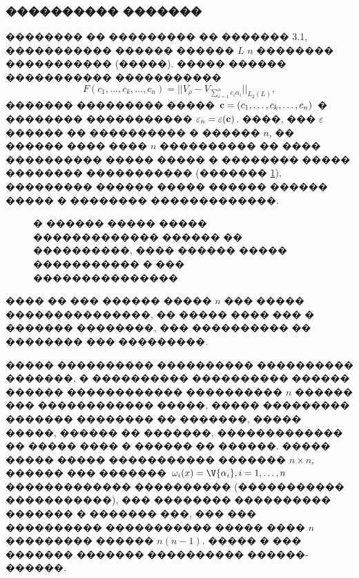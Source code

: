 \documentclass[a4paper]{article}
\begin{document}
\subsubsection{���������� �������}
�������� �� ��������� �� ������� 3.1, ����������� ������ ������ $L$ $n$ �������� ����������� (�����).
����� ������ ����������� �����������
\begin{equation*}
  F(c_1,\dots,c_k,\dots,c_n)=||V_{\rho}-V_{\sum_{i=1}^n c_i \alpha_i}||_{L_2(L)},
\end{equation*}
������� ��������� ����� ${\bf c}=(c_1,\dots,c_k,\dots,c_n)$ � �������� ����������� $\varepsilon_n = \varepsilon ({\bf c})$.
����, ��� $\varepsilon$ ������ �� ���������� � ������ $n$, �� ������ ���� ���� $n$ ���������� �� ���� ���������� ����� ����� � �������� ����� �������� ����������� (������� \ref{points2}),
��������� ������ ����� ������ ������ ����� � �������� �������������.
\begin{figure}[h!]
  \noindent{}
   \caption{� ������ ����� ����� ������������� ������ �� ����������, ���� ������ ����� ����������� � ��� ���������������}   
  \label{points2}
\end{figure}

���� �� ��� ������ ����� $n$ ��� ����� ���������������, �� ����� ���� ��� � ������� ��������, ��� ���������� �� �������� ��� ���������.

����� ���������� ���������� ���������� �������, � ���������� ���������� ������ ������ ������������ ���������� $n$ ������ ��� ������������ �����,
����� ��������� ������� �������� �� �������, ����� �����, ������ �� �������, ������������� �� ����� ���� � ������ �� ������.
����� ����� ����� ����������� ������� $n \times n$, ������ ��� ������� $\omega_i(x) =\V{\alpha_i}, i=1,\dots,n$ ������������� ���������� (����������� �����������), ��� �������� ���������� ������� � ������� ���, ��� ���
���������� ����������� ����� ���� $n$ ��������� ������ $n(n-1)$.
����� � ��� ������� ������� ���������� ������-������.
\end{document}
